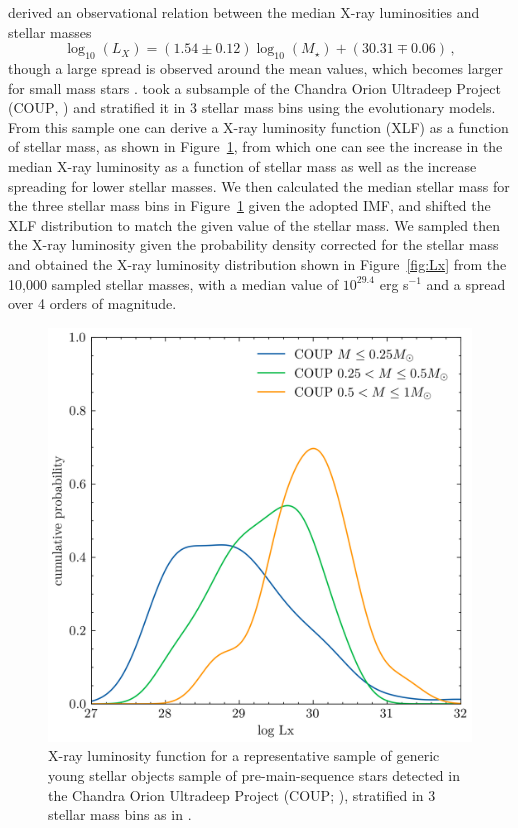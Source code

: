 \documentclass[fleqn,usenatbib,letters]{mnras}
\begin{document}
\citet{Gudel2007} derived an observational relation between the median X-ray luminosities and stellar masses
\begin{equation} \label{eq:LxMstar}
    \log_{10}(L_{X}) = (1.54\pm0.12) \log_{10}(M_\star) + (30.31\mp0.06) \,,
\end{equation}
though a large spread is observed around the mean values, which becomes larger for small mass stars \citep[e.g.][]{Getman2022}.
\citet{Kuhn2019} took a subsample of the Chandra Orion Ultradeep Project (\textsc{COUP}, \citet{Feigelson2005,Getman2005}) and stratified it in 3 stellar mass bins using the \citet{Baraffe1998} evolutionary models. From this sample one can derive a X-ray luminosity function (XLF) as a function of stellar mass, as shown in Figure~\ref{fig:XLF}, from which one can see the increase in the median X-ray luminosity as a function of stellar mass as well as the increase spreading for lower stellar masses. We then calculated the median stellar mass for the three stellar mass bins in Figure~\ref{fig:XLF} given the adopted IMF, and shifted the XLF distribution to match the given value of the stellar mass. We sampled then the X-ray luminosity given the probability density corrected for the stellar mass and obtained the X-ray luminosity distribution shown in Figure~\ref{fig:Lx} from the 10,000 sampled stellar masses, with a median value of $10^{29.4}$ erg s$^{-1}$ and a spread over 4 orders of magnitude.
\begin{figure}
    \includegraphics[width=0.95\columnwidth]{XLF}
    \caption{X-ray luminosity function for a representative sample of generic young stellar objects sample of pre-main-sequence stars detected in the Chandra Orion Ultradeep Project (\textsc{COUP}; \citet{Feigelson2005,Getman2005}), stratified in 3 stellar mass bins as in \citet{Kuhn2019}. \label{fig:XLF}}
\end{figure}
\end{document}
